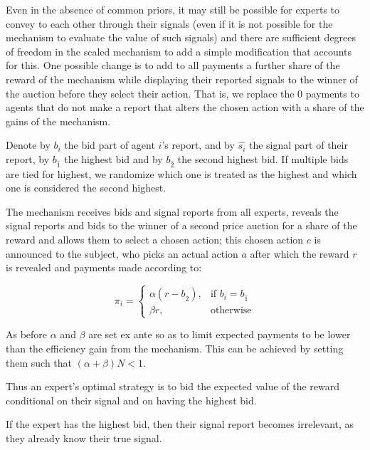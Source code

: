 Even in the absence of common priors, it may still be possible for experts to convey to each other through their signals (even if it is not possible for the mechanism to evaluate the value of such signals) and there are sufficient degrees of freedom in the scaled mechanism to add a simple modification that accounts for this.
One possible change is to add to all payments a further share of the reward of the mechanism while displaying their reported signals to the winner of the auction before they select their action. That is, we replace the 0 payments to agents that do not make a report that alters the chosen action with a share of the gains of the mechanism.

Denote by $b_i$ the bid part of agent $i$'s report, and by $\hat{s_i}$ the signal part of their report, by $b_{\hat{1}}$ the highest bid and by $b_{\hat{2}}$ the second highest bid. If multiple bids are tied for highest, we randomize which one is treated as the highest and which one is considered the second highest.

\begin{mech}
The mechanism receives bids and signal reports from all experts, reveals the signal reports and bids to the winner of a second price auction for a share of the reward and allows them to select a chosen action; this chosen action $c$ is announced to the subject, who picks an actual action $a$ after which the reward $r$ is revealed and payments made according to:

\[
    \pi_i = 
\begin{cases}
    \alpha (r - b_{\hat{2}} ) ,& \text{if } b_i = b_{\hat{1}}\\
    \beta r,              & \text{otherwise}
\end{cases}
\]

\end{mech}

As before $\alpha$ and $\beta$ are set ex ante so as to limit expected payments to be lower than the efficiency gain from the mechanism. This can be achieved by setting them such that $(\alpha + \beta)N < 1$.


Thus an expert's optimal strategy is to bid the expected value of the reward conditional on their signal and on having the highest bid.



If the expert has the highest bid, then their signal report becomes irrelevant, as they already know their true signal. %

